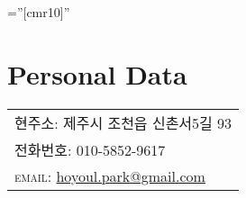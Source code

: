 \documentclass[a4paper,10pt]{article} %
\begin{document}
\pagestyle{empty} %

\font\fb=''[cmr10]'' %



\par{\bigskip\par} %
\bigskip
\section{Personal Data}

\begin{tabular}{l}
\textsc{현주소:}  제주시 조천읍 신촌서5길 93 \\
\textsc{전화번호:}  010-5852-9617\\
\textsc{email:}  \href{mailto:hoyoul.park@gmail.com}{hoyoul.park@gmail.com}
\end{tabular}

\bigskip
\end{document}

